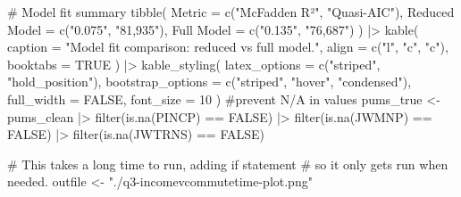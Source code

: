 \documentclass[
  letterpaper,
  DIV=11,
  numbers=noendperiod]{scrartcl}
\newenvironment{Shaded}{\begin{snugshade}}{\end{snugshade}}
\newcommand{\AttributeTok}[1]{\textcolor[rgb]{0.40,0.45,0.13}{#1}}
\newcommand{\CommentTok}[1]{\textcolor[rgb]{0.37,0.37,0.37}{#1}}
\newcommand{\ConstantTok}[1]{\textcolor[rgb]{0.56,0.35,0.01}{#1}}
\newcommand{\DecValTok}[1]{\textcolor[rgb]{0.68,0.00,0.00}{#1}}
\newcommand{\FunctionTok}[1]{\textcolor[rgb]{0.28,0.35,0.67}{#1}}
\newcommand{\NormalTok}[1]{\textcolor[rgb]{0.00,0.23,0.31}{#1}}
\newcommand{\OtherTok}[1]{\textcolor[rgb]{0.00,0.23,0.31}{#1}}
\newcommand{\SpecialCharTok}[1]{\textcolor[rgb]{0.37,0.37,0.37}{#1}}
\newcommand{\StringTok}[1]{\textcolor[rgb]{0.13,0.47,0.30}{#1}}
\begin{document}
\begin{Shaded}
\begin{Highlighting}[]
\CommentTok{\# Model fit summary}
\FunctionTok{tibble}\NormalTok{(}
  \AttributeTok{Metric          =} \FunctionTok{c}\NormalTok{(}\StringTok{"McFadden R²"}\NormalTok{, }\StringTok{"Quasi{-}AIC"}\NormalTok{),}
  \StringTok{\textasciigrave{}}\AttributeTok{Reduced Model}\StringTok{\textasciigrave{}} \OtherTok{=} \FunctionTok{c}\NormalTok{(}\StringTok{"0.075"}\NormalTok{, }\StringTok{"81,935"}\NormalTok{),}
  \StringTok{\textasciigrave{}}\AttributeTok{Full Model}\StringTok{\textasciigrave{}}    \OtherTok{=} \FunctionTok{c}\NormalTok{(}\StringTok{"0.135"}\NormalTok{, }\StringTok{"76,687"}\NormalTok{)}
\NormalTok{) }\SpecialCharTok{|\textgreater{}}
  \FunctionTok{kable}\NormalTok{(}
    \AttributeTok{caption  =} \StringTok{"Model fit comparison: reduced vs full model."}\NormalTok{,}
    \AttributeTok{align    =} \FunctionTok{c}\NormalTok{(}\StringTok{"l"}\NormalTok{, }\StringTok{"c"}\NormalTok{, }\StringTok{"c"}\NormalTok{),}
    \AttributeTok{booktabs =} \ConstantTok{TRUE}
\NormalTok{  ) }\SpecialCharTok{|\textgreater{}}
  \FunctionTok{kable\_styling}\NormalTok{(}
    \AttributeTok{latex\_options     =} \FunctionTok{c}\NormalTok{(}\StringTok{"striped"}\NormalTok{, }\StringTok{"hold\_position"}\NormalTok{),}
    \AttributeTok{bootstrap\_options =} \FunctionTok{c}\NormalTok{(}\StringTok{"striped"}\NormalTok{, }\StringTok{"hover"}\NormalTok{, }\StringTok{"condensed"}\NormalTok{),}
    \AttributeTok{full\_width        =} \ConstantTok{FALSE}\NormalTok{,}
    \AttributeTok{font\_size         =} \DecValTok{10}
\NormalTok{  )}
\CommentTok{\#prevent N/A in values}
\NormalTok{ pums\_true }\OtherTok{\textless{}{-}}\NormalTok{ pums\_clean }\SpecialCharTok{|\textgreater{}} 
    \FunctionTok{filter}\NormalTok{(}\FunctionTok{is.na}\NormalTok{(PINCP) }\SpecialCharTok{==} \ConstantTok{FALSE}\NormalTok{) }\SpecialCharTok{|\textgreater{}}
    \FunctionTok{filter}\NormalTok{(}\FunctionTok{is.na}\NormalTok{(JWMNP) }\SpecialCharTok{==} \ConstantTok{FALSE}\NormalTok{) }\SpecialCharTok{|\textgreater{}}
    \FunctionTok{filter}\NormalTok{(}\FunctionTok{is.na}\NormalTok{(JWTRNS) }\SpecialCharTok{==} \ConstantTok{FALSE}\NormalTok{)}

\CommentTok{\# This takes a long time to run, adding if statement}
\CommentTok{\# so it only gets run when needed.}
\NormalTok{outfile }\OtherTok{\textless{}{-}} \StringTok{"./q3{-}incomevcommutetime{-}plot.png"}


\end{Highlighting}
\end{Shaded}
\end{document}
